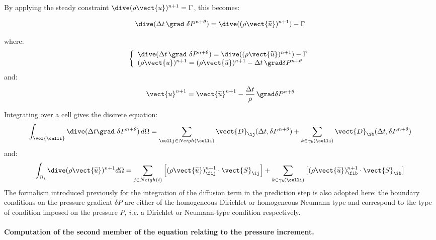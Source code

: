 By applying the steady constraint $\dive(\rho\vect{u})^{n+1}=\Gamma$,
this becomes:

\begin{equation}
\dive(\Delta t\, \grad\ \delta P^{n+\theta})=\dive((\rho \vect{\widetilde{u}})^{n+1})-\Gamma
\end{equation}

where:
\begin{equation}
\left\{\begin{array}{l}
\dive(\Delta t\, \grad\ \delta P^{n+\theta})=\dive((\rho \vect{\widetilde{u}})^{n+1})-\Gamma\\
(\rho\vect{u})^{n+1} = (\rho\vect{\widetilde{u}})^{n+1}-\Delta t\, \grad \delta P^{n+\theta}
\end{array}\right.
\end{equation}
and:
\begin{equation}
\label{eq:navstv:discrete_correction_velocity}
\vect{u}^{n+1} = \vect{\widetilde{u}}^{n+1}-\frac{\Delta t}{\rho}\, \grad\delta
P^{n+\theta}
\end{equation}

Integrating over a cell gives the discrete equation:
\begin{equation}
\int_{\vol{\celli}}{\dive(\Delta t \grad\ \delta P^{n+\theta})\, d\Omega} =
\sum\limits_{\cellj \in Neigh(\celli)}{\vect{D}_{\ij}(\Delta t, \delta P^{n+\theta})}
+\sum_{k\in {\gamma_b(\celli)}} {\vect{D}_{\ib}(\Delta t, \delta P^{n+\theta})}
\label{eq:navstv:discrete_correction_step}
\end{equation}
and:
\begin{equation}
\int_{\Omega_i}{\dive(\rho \vect{\widetilde{u}})^{n+1}  d\Omega} =
\sum_{j\in Neigh{(i)}}{\left[ (\rho
\vect{\widetilde{u}})^{n+1}_{\fij} \cdot \vect{S}_{\ij}\right]}
+\sum_{k\in {\gamma_b(\celli)}} \left[{(\rho \vect{\widetilde{u}})^{n+1}_{\fib}} \cdot \vect{S}_{\ib}\right]
\end{equation}
The formalism introduced previously for the integration of the diffusion term in
the prediction step is also adopted here: the boundary conditions on the
pressure gradient $\delta P$ are either of the homogeneous Dirichlet or
homogeneous Neumann type and correspond to the type of condition imposed
on the pressure $P$, \emph{i.e.} a Dirichlet or Neumann-type condition
respectively.

\paragraph{Computation of the second member of the equation relating to the
pressure increment.\\ }

